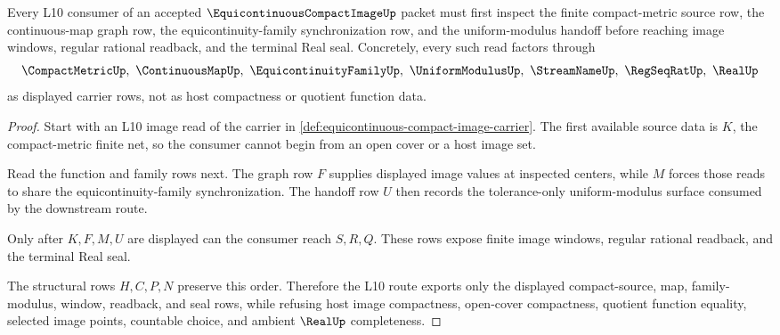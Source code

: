 \begin{theorem}\label{thm:equicontinuous-compact-image-l10-route}
Every L10 consumer of an accepted $\EquicontinuousCompactImageUp$ packet must first inspect the finite compact-metric source row, the continuous-map graph row, the equicontinuity-family synchronization row, and the uniform-modulus handoff before reaching image windows, regular rational readback, and the terminal Real seal. Concretely, every such read factors through
$$
\CompactMetricUp,\ \ContinuousMapUp,\ \EquicontinuityFamilyUp,\ \UniformModulusUp,\ \StreamNameUp,\ \RegSeqRatUp,\ \RealUp
$$
as displayed carrier rows, not as host compactness or quotient function data.
\end{theorem}
\begin{proof}
Start with an L10 image read of the carrier in \autoref{def:equicontinuous-compact-image-carrier}. The first available source data is $K$, the compact-metric finite net, so the consumer cannot begin from an open cover or a host image set.

Read the function and family rows next. The graph row $F$ supplies displayed image values at inspected centers, while $M$ forces those reads to share the equicontinuity-family synchronization. The handoff row $U$ then records the tolerance-only uniform-modulus surface consumed by the downstream route.

Only after $K,F,M,U$ are displayed can the consumer reach $S,R,Q$. These rows expose finite image windows, regular rational readback, and the terminal Real seal.

The structural rows $H,C,P,N$ preserve this order. Therefore the L10 route exports only the displayed compact-source, map, family-modulus, window, readback, and seal rows, while refusing host image compactness, open-cover compactness, quotient function equality, selected image points, countable choice, and ambient $\RealUp$ completeness.
\end{proof}



